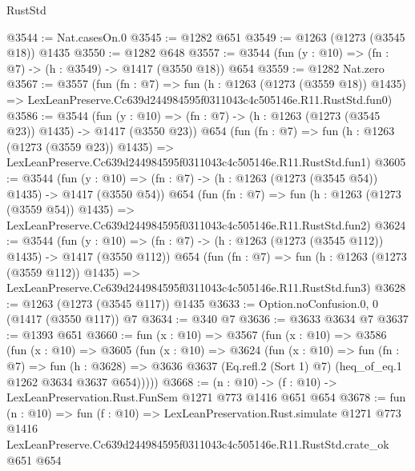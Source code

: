 \begin{lexlean}{RustStd}
\begin{coremodule}
@3544 := Nat.casesOn.{0}
@3545 := @1282 @651
@3549 := @1263 (@1273 (@3545 @18)) @1435
@3550 := @1282 @648
@3557 := @3544 (fun (y : @10) => (fn : @7) -> (h : @3549) -> @1417 (@3550 @18)) @654
@3559 := @1282 Nat.zero
@3567 := @3557
    (fun (fn : @7) =>
    fun (h : @1263 (@1273 (@3559 @18)) @1435) =>
    LexLeanPreserve.Cc639d244984595f0311043c4c505146e.R11.RustStd.fun0)
@3586 := @3544
    (fun (y : @10) => (fn : @7) -> (h : @1263 (@1273 (@3545 @23)) @1435) -> @1417 (@3550 @23))
    @654
    (fun (fn : @7) =>
    fun (h : @1263 (@1273 (@3559 @23)) @1435) =>
    LexLeanPreserve.Cc639d244984595f0311043c4c505146e.R11.RustStd.fun1)
@3605 := @3544
    (fun (y : @10) => (fn : @7) -> (h : @1263 (@1273 (@3545 @54)) @1435) -> @1417 (@3550 @54))
    @654
    (fun (fn : @7) =>
    fun (h : @1263 (@1273 (@3559 @54)) @1435) =>
    LexLeanPreserve.Cc639d244984595f0311043c4c505146e.R11.RustStd.fun2)
@3624 := @3544
    (fun (y : @10) => (fn : @7) -> (h : @1263 (@1273 (@3545 @112)) @1435) -> @1417 (@3550 @112))
    @654
    (fun (fn : @7) =>
    fun (h : @1263 (@1273 (@3559 @112)) @1435) =>
    LexLeanPreserve.Cc639d244984595f0311043c4c505146e.R11.RustStd.fun3)
@3628 := @1263 (@1273 (@3545 @117)) @1435
@3633 := Option.noConfusion.{0, 0} (@1417 (@3550 @117)) @7
@3634 := @340 @7
@3636 := @3633 @3634 @7
@3637 := @1393 @651
@3660 := fun (x : @10) =>
  @3567
    (fun (x : @10) =>
    @3586
      (fun (x : @10) =>
      @3605
        (fun (x : @10) =>
        @3624
          (fun (x : @10) =>
          fun (fn : @7) =>
          fun (h : @3628) =>
          @3636 @3637 (Eq.refl.{2} (Sort 1) @7) (heq_of_eq.{1} @1262 @3634 @3637 @654)))))
@3668 := (n : @10) -> (f : @10) -> LexLeanPreservation.Rust.FunSem @1271 @773 @1416 @651 @654
@3678 := fun (n : @10) =>
  fun (f : @10) =>
  LexLeanPreservation.Rust.simulate
    @1271
    @773
    @1416
    LexLeanPreserve.Cc639d244984595f0311043c4c505146e.R11.RustStd.crate_ok
    @651
    @654
\end{coremodule}
\end{lexlean}
